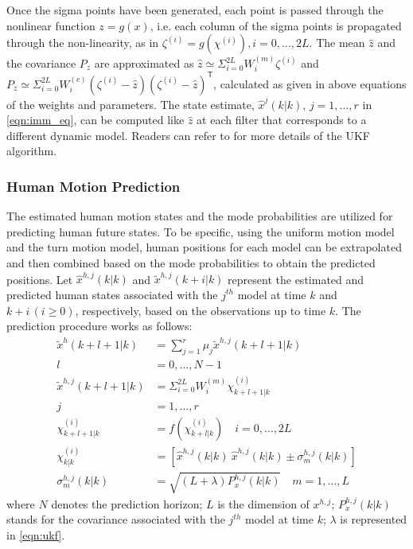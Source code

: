 \documentclass[letterpaper, 10 pt, conference]{ieeeconf}
\newcommand{\todoQ}[1]{\vspace{0px} %
	\todo[inline, color=orange!50]{\textbf{[Note:]} {#1}} %
}
\begin{document}
	Once the sigma points have been generated, each point is passed through the nonlinear function $z=g(x)$, i.e. each column of the sigma points is propagated through the non-linearity, as in $\zeta^{(i)}=g(\chi^{(i)}), i=0,...,2L$. The mean $\hat{z}$ and the covariance $P_z$ are approximated as $\hat{z}\simeq \Sigma_{i=0}^{2L}W_i^{(m)} \zeta^{(i)}$ and $P_z \simeq  \Sigma_{i=0}^{2L}W_i^{(c)}(\zeta^{(i)}-\hat{z})(\zeta^{(i)}-\hat{z})^\mathsf{T}$, calculated as given in above equations of the weights and parameters\cite{hong2013vehicle}. The state estimate, $\hat{x}^j(k|k)$, $j=1,...,r$ in \cref{eqn:imm_eq}, can be computed like $\hat{z}$ at each filter that corresponds to a different dynamic model. 
	Readers can refer to \cite {haykin2004kalman} for more details of the UKF algorithm.
	
	\subsubsection{Human Motion Prediction}\label{subsec:motion_pred}
	The estimated human motion states and the mode probabilities are utilized for predicting human future states.
	To be specific, using the uniform motion model and the turn motion model, human positions for each model can be extrapolated and then combined based on the mode probabilities to obtain the predicted positions.
	Let $\hat{x}^{h,j}(k|k)$ and $\tilde{x}^{h,j}(k+i|k)$ represent the estimated and predicted human states associated with the $j^{th}$ model at time $k$ and $k+i\,(i\ge 0)$, respectively, based on the observations up to time $k$.
	The prediction procedure works as follows:
	\begin{subequations}\label{eqn:motion_pred_imm}
		\begin{align}
		\tilde{x}^h(k+l+1|k)&=\sum\limits_{j=1}^{r}\mu_j \tilde{x}^{h,j}(k+l+1|k)\\ l&=0,\dots,N-1\nonumber \\
		\tilde{x}^{h,j}(k+l+1|k)&=\Sigma_{i=0}^{2L}W_i^{(m)} \chi_{k+l+1|k}^{(i)}\\ j&=1,\dots,r\nonumber \\
		\chi_{k+l+1|k}^{(i)}&=f(\chi_{k+l|k}^{(i)}) \quad i=0,\dots, 2L\\
		\chi_{k|k}^{(i)}&=\left[\hat{x}^{h,j}(k|k)\ \hat{x}^{h,j}(k|k) \pm \sigma_{m}^{h,j}(k|k) \right]\\
		\sigma^{h,j}_m(k|k)&=\sqrt{(L+\lambda)P_x^{h,j}(k|k)} \quad m=1,\dots,L 
		\end{align}
	\end{subequations}
	where $N$ denotes the prediction horizon; $L$ is the dimension of $x^{h,j}$; $P_x^{h,j}(k|k)$ stands for the covariance associated with the $j^{th}$ model at time $k$; $\lambda$ is represented in \cref{eqn:ukf}.
	
\end{document}

